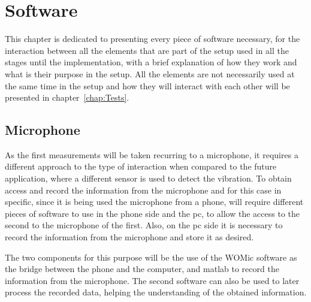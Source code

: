 \cleardoublepage
\chapter{Software}\label{chap:software}
This chapter is dedicated to presenting every piece of software necessary, for the interaction between all the elements that are part of the setup used in all the stages until the implementation, with a brief explanation of how they work and what is their purpose in the setup. All the elements are not necessarily used at the same time in the setup and how they will interact with each other will be presented in chapter~\ref{chap:Tests}.
\section{Microphone}
As the first measurements will be taken recurring to a microphone, it requires a different approach to the type of interaction when compared to the future application, where a different sensor is used to detect the vibration. To obtain access and record the information from the microphone and for this case in specific, since it is being used the microphone from a phone, will require different pieces of software to use in the phone side and the \acrshort{pc}, to allow the access to the second to the microphone of the first. Also, on the \acrshort{pc} side it is necessary to record the information from the microphone and store it as desired.

The two components for this purpose will be the use of the WOMic software as the bridge between the phone and the computer, and \acrshort{matlab} to record the information from the microphone. The second software can also be used to later process the recorded data, helping the understanding of the obtained information. 
